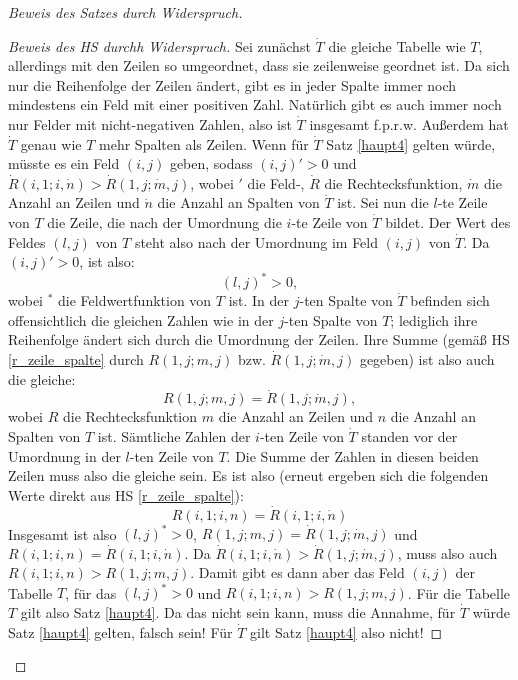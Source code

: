 \begin{proof}[Beweis des Satzes durch Widerspruch]
\begin{proof}[Beweis des HS durchh Widerspruch]
        Sei zunächst $\dot T$ die gleiche Tabelle wie $T$, allerdings mit den Zeilen so umgeordnet, dass sie 
        zeilenweise geordnet ist. Da sich nur die Reihenfolge der Zeilen ändert, gibt es in jeder Spalte immer noch 
        mindestens ein Feld mit einer positiven Zahl. Natürlich gibt es auch immer noch nur Felder mit nicht-negativen 
        Zahlen, also ist $\dot T$ insgesamt f.p.r.w. Außerdem hat $\dot T$ genau wie $T$ mehr Spalten als Zeilen. 
        Wenn für $\dot T$ Satz \ref{haupt4} gelten würde, müsste es ein Feld $(i, j)$ geben, sodass $(i, j)'>0$ 
        und $\dot R(i, 1; i, \dot n) > \dot R(1, j; \dot m, j)$, wobei $'$ die Feld-, $\dot R$ die Rechtecksfunktion, 
        $\dot m$ die Anzahl an Zeilen und $\dot n$ die Anzahl an Spalten von $\dot T$ ist. Sei nun die $l$-te Zeile 
        von $T$ die Zeile, die nach der Umordnung die $i$-te Zeile von $\dot T$ bildet. Der Wert des Feldes $(l, j)$ 
        von $T$ steht also nach der Umordnung im Feld $(i, j)$ von $\dot T$. Da $(i, j)'>0$, ist also:
        \[
            (l, j)^*>0,
        \]
        wobei $^*$ die Feldwertfunktion von $T$ ist. In der $j$-ten Spalte von $\dot T$ befinden sich offensichtlich 
        die gleichen Zahlen wie in der $j$-ten Spalte von $T$; lediglich ihre Reihenfolge ändert sich durch die 
        Umordnung der Zeilen. Ihre Summe (gemäß HS \ref{r_zeile_spalte} durch $R(1, j; m, j)$ bzw. $\dot R(1, j; 
        \dot m, j)$ gegeben) ist also auch die gleiche:
        \[
            R(1, j; m, j)=\dot R(1, j; \dot m, j),
        \]
        wobei $R$ die Rechtecksfunktion $m$ die Anzahl an Zeilen und $n$ die Anzahl an Spalten von $T$ ist. 
        Sämtliche Zahlen der $i$-ten Zeile von $\dot T$ standen vor der Umordnung in der $l$-ten Zeile von $T$. 
        Die Summe der Zahlen in diesen beiden Zeilen muss also die gleiche sein. Es ist also (erneut ergeben sich die 
        folgenden Werte direkt aus HS \ref{r_zeile_spalte}):
        \[
            R(i, 1; i, n)=\dot R(i, 1; i, \dot n)
        \]
        Insgesamt ist also $(l, j)^*>0$, $R(1, j; m, j)=\dot R(1, j; \dot m, j)$ und $R(i, 1; i, n)=\dot R(i, 1; i, 
        \dot n)$. Da $\dot R(i, 1; i, \dot n) > \dot R(1, j; \dot m, j)$, muss also auch $R(i, 1; i, n) > 
        R(1, j; m, j)$. Damit gibt es dann aber das Feld $(i, j)$ der Tabelle $T$, für das $(l, j)^*>0$ und $R(i, 
        1; i, n) > R(1, j; m, j)$. Für die Tabelle $T$ gilt also Satz \ref{haupt4}. Da das nicht sein kann, 
        muss die Annahme, für $\dot T$ würde Satz \ref{haupt4} gelten, falsch sein! Für $\dot T$ gilt Satz 
        \ref{haupt4} also nicht!


\end{proof}
\end{proof}

